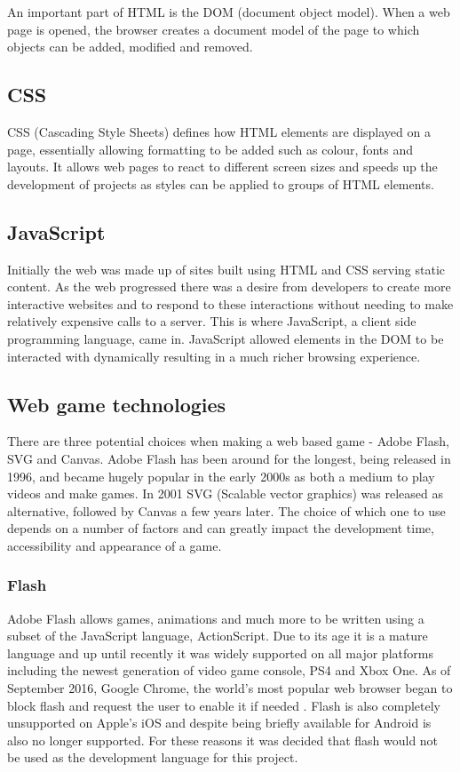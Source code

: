 \documentclass[12pt,a4paper]{report}
\begin{document}
An important part of HTML is the DOM (document object model). When a web page is opened, the browser creates a document model of the page to which objects can be added, modified and removed. 

\subsection{CSS}
CSS (Cascading Style Sheets) defines how HTML elements are displayed on a page, essentially allowing formatting to be added such as colour, fonts and layouts. It allows web pages to react to different screen sizes and speeds up the development of projects as styles can be applied to groups of HTML elements. 

\subsection{JavaScript}
Initially the web was made up of sites built using HTML and CSS serving static content. As the web progressed there was a desire from developers to create more interactive websites and to respond to these interactions without needing to make relatively expensive calls to a server. This is where JavaScript, a client side programming language, came in. JavaScript allowed elements in the DOM to be interacted with dynamically resulting in a much richer browsing experience.

\subsection{Web game technologies}
There are three potential choices when making a web based game - Adobe Flash, SVG and Canvas. Adobe Flash has been around for the longest, being released in 1996, and became hugely popular in the early 2000s as both a medium to play videos and make games. In 2001 SVG (Scalable vector graphics) was released as alternative, followed by Canvas a few years later. The choice of which one to use depends on a number of factors and can greatly impact the development time, accessibility and appearance of a game. 

\subsubsection{Flash}
Adobe Flash allows games, animations and much more to be written using a subset of the JavaScript language, ActionScript. Due to its age it is a mature language and up until recently it was widely supported on all major platforms including the newest generation of video game console, PS4 and Xbox One. As of September 2016, Google Chrome, the world's most popular web browser began to block flash and request the user to enable it if needed \citep{FlashInChrome}. Flash is also completely unsupported on Apple's iOS and despite being briefly available for Android is also no longer supported. For these reasons it was decided that flash would not be used as the development language for this project.
\end{document}
